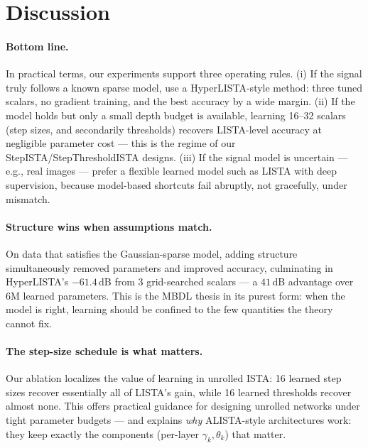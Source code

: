 \documentclass[12pt,a4paper]{article}
\begin{document}
\section{Discussion}
\label{sec:discussion}

\paragraph{Bottom line.} In practical terms, our experiments support three operating rules. (i) If the signal truly follows a known sparse model, use a HyperLISTA-style method: three tuned scalars, no gradient training, and the best accuracy by a wide margin. (ii) If the model holds but only a small depth budget is available, learning 16--32 scalars (step sizes, and secondarily thresholds) recovers LISTA-level accuracy at negligible parameter cost --- this is the regime of our StepISTA/StepThresholdISTA designs. (iii) If the signal model is uncertain --- e.g., real images --- prefer a flexible learned model such as LISTA with deep supervision, because model-based shortcuts fail abruptly, not gracefully, under mismatch.

\paragraph{Structure wins when assumptions match.} On data that satisfies the Gaussian-sparse model, adding structure simultaneously removed parameters and improved accuracy, culminating in HyperLISTA's $-61.4$\,dB from 3 grid-searched scalars --- a $41$\,dB advantage over 6M learned parameters. This is the MBDL thesis in its purest form: when the model is right, learning should be confined to the few quantities the theory cannot fix.

\paragraph{The step-size schedule is what matters.} Our ablation localizes the value of learning in unrolled ISTA: 16 learned step sizes recover essentially all of LISTA's gain, while 16 learned thresholds recover almost none. This offers practical guidance for designing unrolled networks under tight parameter budgets --- and explains \emph{why} ALISTA-style architectures work: they keep exactly the components (per-layer $\gamma_k, \theta_k$) that matter.
\end{document}
